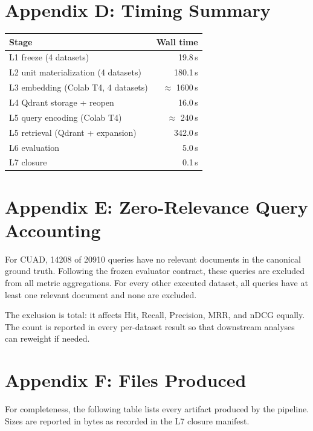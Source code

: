 \documentclass[11pt,a4paper]{article}
\begin{document}
\section{Appendix D: Timing Summary}

\begin{center}
\small
\begin{tabular}{l r}
\toprule
\textbf{Stage} & \textbf{Wall time} \\
\midrule
L1 freeze (4 datasets)                & \num{19.8}\,\si{s} \\
L2 unit materialization (4 datasets)  & \num{180.1}\,\si{s} \\
L3 embedding (Colab T4, 4 datasets)   & $\approx$ \num{1600}\,\si{s} \\
L4 Qdrant storage + reopen            & \num{16.0}\,\si{s} \\
L5 query encoding (Colab T4)          & $\approx$ \num{240}\,\si{s} \\
L5 retrieval (Qdrant + expansion)     & \num{342.0}\,\si{s} \\
L6 evaluation                         & \num{5.0}\,\si{s} \\
L7 closure                            & \num{0.1}\,\si{s} \\
\bottomrule
\end{tabular}
\end{center}

\section{Appendix E: Zero-Relevance Query Accounting}

For CUAD, \num{14208} of \num{20910} queries have no relevant
documents in the canonical ground truth. Following the frozen
evaluator contract, these queries are excluded from all metric
aggregations. For every other executed dataset, all queries have at
least one relevant document and none are excluded.

The exclusion is total: it affects Hit, Recall, Precision, MRR, and
nDCG equally. The count is reported in every per-dataset result so
that downstream analyses can reweight if needed.

\section{Appendix F: Files Produced}

For completeness, the following table lists every artifact
produced by the pipeline. Sizes are reported in bytes as recorded in
the L7 closure manifest.
\end{document}
